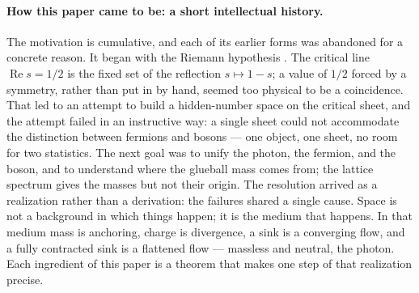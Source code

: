 \documentclass[aps,prd,preprint,superscriptaddress,amsmath,amssymb]{revtex4-2}
\begin{document}
\paragraph{How this paper came to be: a short intellectual history.}
The motivation is cumulative, and each of its earlier forms was
abandoned for a concrete reason.  It began with the Riemann hypothesis
\cite{riemann1859ueber}.  The critical line $\operatorname{Re}s=1/2$
is the fixed set of the reflection $s\mapsto 1-s$; a value of $1/2$
forced by a symmetry, rather than put in by hand, seemed too physical
to be a coincidence.  That led to an attempt to build a hidden-number
space on the critical sheet, and the attempt failed in an instructive
way: a single sheet could not accommodate the distinction between
fermions and bosons --- one object, one sheet, no room for two
statistics.  The next goal was to unify the photon, the fermion, and
the boson, and to understand where the glueball mass comes from; the
lattice spectrum \cite{morningstar1999glueball,chen2006glueball} gives
the masses but not their origin.  The resolution arrived as a
realization rather than a derivation: the failures shared a single
cause.  Space is not a background in which things happen; it is the
medium that happens.  In that medium mass is anchoring, charge is
divergence, a sink is a converging flow, and a fully contracted sink is
a flattened flow --- massless and neutral, the photon.  Each ingredient
of this paper is a theorem that makes one step of that realization
precise.
\end{document}
